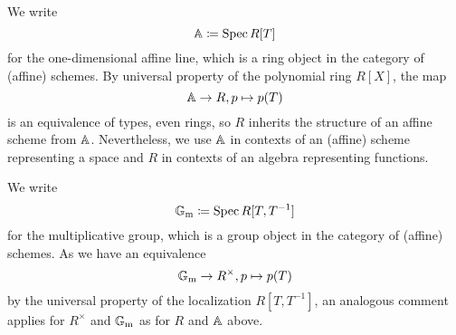 We write
\begin{equation*}
  \mathbb{A} \coloneqq \operatorname{Spec} R[T]
\end{equation*}
for the one-dimensional affine line, which is a ring object in the
category of (affine) schemes.  By universal property of the polynomial
ring $R[X]$, the map
\begin{equation*}
  \mathbb{A} \to R, p \mapsto p(T)
\end{equation*}
is an equivalence of types, even rings, so $R$
inherits the structure of an affine scheme from $\mathbb{A}$.  Nevertheless,
we use $\mathbb{A}$ in contexts of an (affine) scheme representing a space and
$R$ in contexts of an algebra representing functions.

We write
\begin{equation*}
  \mathbb{G}_\mathrm{m} \coloneqq \operatorname{Spec} R[T, T^{-1}]
\end{equation*}
for the multiplicative group, which is a group object in the category of (affine) schemes.  As we have an equivalence
\begin{equation*}
  \mathbb{G}_\mathrm{m} \to R^\times, p \mapsto p(T)
\end{equation*}
by the universal property of the localization $R[T, T^{-1}]$, an
analogous comment applies for $R^\times$ and $\mathbb{G}_\mathrm{m}$ as for $R$ and $\mathbb{A}$
above.

